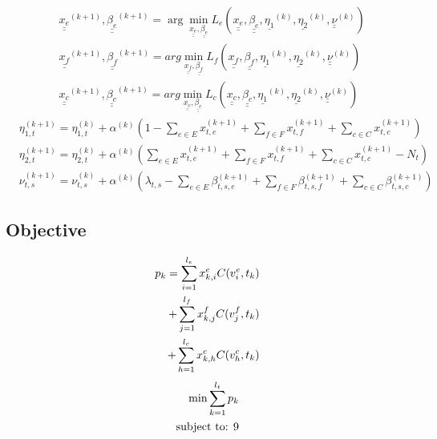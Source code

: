 \documentclass[conference]{IEEEtran}
\begin{document}
    \begin{subequations}
      \begin{align}
        & \underline{\underline {x_e}}^{(k+1)}, \underline{\underline {\beta_e}}^{(k+1)} = \arg \min_{\underline{\underline {x_e}}, \underline{\underline {\beta_e}}}L_e(\underline{\underline {x_e}}, \underline{\underline {\beta_e}}, \underline {\eta_1}^{(k)}, \underline {\eta_2}^{(k)}, \underline{\underline \nu}^{(k)}) \\
        & \underline{\underline {x_f}}^{(k+1)}, \underline{\underline {\beta_f}}^{(k+1)} = arg \min_{\underline{\underline {x_f}}, \underline{\underline {\beta_f}}}L_f(\underline{\underline {x_f}}, \underline{\underline {\beta_f}}, \underline {\eta_1}^{(k)}, \underline {\eta_2}^{(k)}, \underline{\underline \nu}^{(k)}) \\
        & \underline{\underline {x_c}}^{(k+1)}, \underline{\underline {\beta_c}}^{(k+1)} = arg \min_{\underline{\underline {x_c}}, \underline{\underline {\beta_c}}}L_c(\underline{\underline {x_c}}, \underline{\underline {\beta_c}}, \underline {\eta_1}^{(k)}, \underline {\eta_2}^{(k)}, \underline{\underline \nu}^{(k)})
      \end{align}
    \end{subequations}
    \begin{subequations}
      \begin{align}
        &\eta_{1,t}^{(k+1)} = \eta_{1,t}^{(k)} + \alpha^{(k)}(1-\sum_{e \in E}x_{t,e}^{(k+1)} + \sum_{f \in F}x_{t,f}^{(k+1)} + \sum_{c \in C}x_{t,c}^{(k+1)}) \\
        &\eta_{2,t}^{(k+1)} = \eta_{2,t}^{(k)} + \alpha^{(k)}(\sum_{e \in E}x_{t,e}^{(k+1)} + \sum_{f \in F}x_{t,f}^{(k+1)} + \sum_{c \in C}x_{t,c}^{(k+1)}-N_t) \\
        &\nu_{t,s}^{(k+1)} = \nu_{t,s}^{(k)} + \alpha^{(k)}(\lambda_{t,s} - \sum_{e \in E}\beta_{t,s,e}^{(k+1)} + \sum_{f \in F}\beta_{t,s,f}^{(k+1)} +\sum_{c \in C}\beta_{t,s,c}^{(k+1)})
      \end{align}
    \end{subequations}
    \subsection{Objective}

    \begin{subequations}
        \begin{align}
          p_k = \sum_{i=1}^{l_e}x_{k,i}^e C(v_i^e, t_k) \\ \notag
          +\sum_{j=1}^{l_f}x_{k,j}^f C(v_j^f, t_k) \\ \notag
          +\sum_{h=1}^{l_c}x_{k,h}^c C(v_h^c, t_k)
        \end{align}
    \end{subequations}
    \begin{subequations}
    \begin{align}
      \min{\sum_{k=1}^{l_t}{p_k}} \\ \notag
      \text{subject to: 9}
    \end{align}
    \end{subequations}
\end{document}
